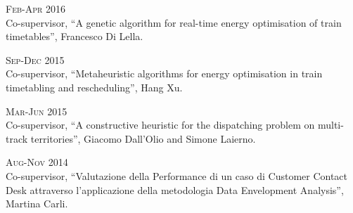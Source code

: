 \begin{paracol}{2}
  \textsc{Feb-Apr 2016}
\switchcolumn
  \\
  Co-supervisor, ``A genetic algorithm for real-time energy optimisation of train timetables'', Francesco Di Lella.
\end{paracol}

\begin{paracol}{2}
  \textsc{Sep-Dec 2015}
\switchcolumn
  \\
  Co-supervisor, ``Metaheuristic algorithms for energy optimisation in train timetabling and rescheduling'', Hang Xu.
\end{paracol}

\begin{paracol}{2}
  \textsc{Mar-Jun 2015}
\switchcolumn
  \\
  Co-supervisor, ``A constructive heuristic for the dispatching problem on multi-track territories'', Giacomo Dall'Olio and Simone Laierno.
\end{paracol}

\begin{paracol}{2}
  \textsc{Aug-Nov 2014}
\switchcolumn
  \\
  Co-supervisor, ``Valutazione della Performance di un caso di Customer Contact Desk attraverso l'applicazione della metodologia Data Envelopment Analysis'', Martina Carli.
\end{paracol}
